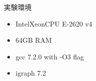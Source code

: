 \documentclass[dvipdfmx,fleqn]{beamer}
\begin{document}
\begin{frame}{実験環境}
  \begin{itemize}
  \item Intel\textsuperscript\textregistered Xeon\textsuperscript\textregistered CPU E-2620 v4
  \item 64GB RAM
  \item gcc 7.2.0 with -O3 flag
  \item igraph 7.2
  \end{itemize}
\end{frame}
\end{document}
